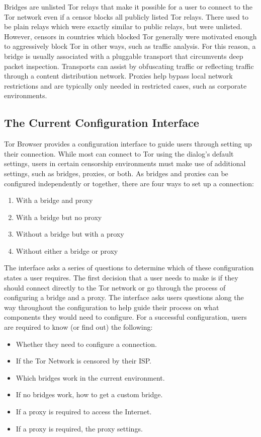 \documentclass[USenglish,oneside,twocolumn]{article}
\begin{document}
Bridges are unlisted Tor relays that make it possible for a user to connect
to the Tor network even if a censor blocks all publicly listed Tor relays. There used 
to be plain relays which were exactly similar to public relays, but were unlisted. However, 
censors in countries which blocked Tor generally were motivated enough to aggressively
block Tor in other ways, such as traffic analysis. For this reason, a bridge is usually associated
with a pluggable transport that circumvents deep packet inspection. Transports can
assist by obfuscating traffic or reflecting traffic through a content distribution network. 
Proxies help bypass local network restrictions and are typically only
needed in restricted cases, such as corporate environments.

\subsection{The Current Configuration Interface} 
Tor Browser provides a configuration interface to guide users through setting up 
their connection. While most can connect to Tor using the
dialog's default settings, users in certain censorship environments must
make use of additional settings, such as bridges, proxies, or both. As bridges and proxies can be configured independently or together, there are
four ways to set up a connection:\\

\begin{enumerate}
    \item With a bridge and proxy
    \item With a bridge but no proxy
    \item Without a bridge but with a proxy
    \item Without either a bridge or proxy
\end{enumerate}

The interface asks a series of questions to determine which of these configuration states a user requires. The first decision that a user needs to make is if they should connect directly to the Tor network or go through the process of  configuring a bridge and a proxy. The interface asks users questions along the way throughout the configuration to help guide their process on what components they would need to configure. For a successful configuration, users are required to know (or find out) the following:\\

\begin{itemize}
	\item{Whether they need to configure a connection.} 
	\item{If the Tor Network is censored by their ISP.}
	\item{Which bridges work in the current environment.} 
	\item{If no bridges work, how to get a custom bridge.} 
	\item{If a proxy is required to access the Internet.}
	\item{If a proxy is required, the proxy settings.}
\end{itemize}
\end{document}
